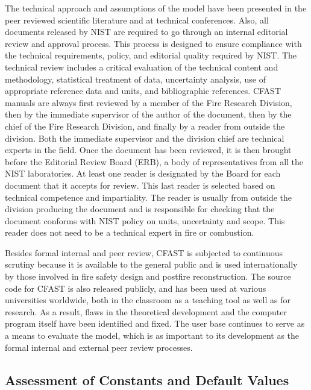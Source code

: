 The technical approach and assumptions of the model have been presented in the peer reviewed scientific literature and at technical conferences. Also, all documents released by NIST are required to go through an internal editorial review and approval process. This process is designed to ensure compliance with the technical requirements, policy, and editorial quality required by NIST. The technical review includes a critical evaluation of the technical content and methodology, statistical treatment of data, uncertainty analysis, use of appropriate reference data and units, and bibliographic references. CFAST manuals are always first reviewed by a member of the Fire Research Division, then by the immediate supervisor of the author of the document, then by the chief of the Fire Research Division, and finally by a reader from outside the division. Both the immediate supervisor and the division chief are technical experts in the field. Once the document has been reviewed, it is then brought before the Editorial Review Board (ERB), a body of representatives from all the NIST laboratories. At least one reader is designated by the Board for each document that it accepts for review. This last reader is selected based on technical competence and impartiality. The reader is usually from outside the division producing the document and is responsible for checking that the document conforms with NIST policy on units, uncertainty and scope. This reader does not need to be a technical expert in fire or combustion.

Besides formal internal and peer review, CFAST is subjected to continuous scrutiny because it is available to the general public and is used internationally by those involved in fire safety design and postfire reconstruction. The source code for CFAST is also released publicly, and has been used at various universities worldwide, both in the classroom as a teaching tool as well as for research. As a result, flaws in the theoretical development and the computer program itself have been identified and fixed. The user base continues to serve as a means to evaluate the model, which is as important to its development as the formal internal and external peer review processes.

\subsection{Assessment of Constants and Default Values}

